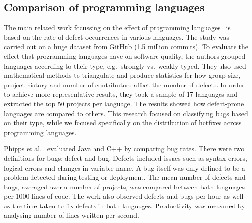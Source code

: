 \documentclass{sig-alternate}
\begin{document}


\subsection{Comparison of programming languages}


The main related work focussing on the effect of programming languages~\cite{Ray2014} is based on the rate of defect occurrences in various languages. The study was carried out on a huge dataset from GitHub (1.5 million commits). To evaluate the effect that programming languages have on software quality, the authors grouped languages according to their type, e.g.\ strongly vs.\ weakly typed. They also used mathematical methods to triangulate and produce statistics for how group size, project history and number of contributors affect the number of defects. In order to achieve more representative results, they took a sample of 17 languages and extracted the top 50 projects per language. The results showed how defect-prone languages are compared to others. This research focused on classifying bugs based on their type, while we focused specifically on the distribution of hotfixes across programming languages.

Phipps et al.~\cite{Phipps1999} evaluated Java and C++ by comparing bug rates. There were two definitions for bugs: defect and bug. Defects included issues such as syntax errors, logical errors and changes in variable name. A bug itself was only defined to be a problem detected during testing or deployment. The mean number of defects and bugs, averaged over a number of projects, was compared between both languages per 1000 lines of code. The work also observed defects and bugs per hour as well as the time taken to fix defects in both languages. Productivity was measured by analysing number of lines written per second.
\end{document}
